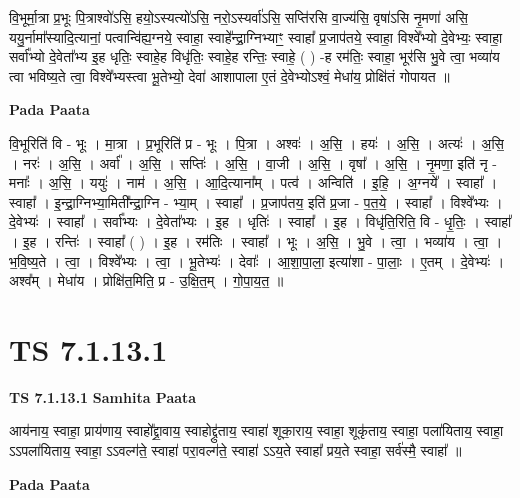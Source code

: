 \documentclass[17pt]{extarticle}
\begin{document}
वि॒भूर्मा॒त्रा प्र॒भूः पि॒त्राश्वो॑ऽसि॒ हयो॒ऽस्यत्यो॑ऽसि॒ नरो॒ऽस्यर्वा॑ऽसि॒ सप्ति॑रसि वा॒ज्य॑सि॒ वृषा॑ऽसि नृ॒मणा॑ असि॒ ययु॒र्नामा᳚स्यादि॒त्यानां॒ पत्वान्वि॑ह्य॒ग्नये॒ स्वाहा॒ स्वाहे᳚न्द्रा॒ग्निभ्याꣳ॒॒ स्वाहा᳚ प्र॒जाप॑तये॒ स्वाहा॒ विश्वे᳚भ्यो दे॒वेभ्यः॒ स्वाहा॒ सर्वा᳚भ्यो दे॒वेता᳚भ्य इ॒ह धृतिः॒ स्वाहे॒ह विधृ॑तिः॒ स्वाहे॒ह रन्तिः॒ स्वाहे॒ ( ) -ह रम॑तिः॒ स्वाहा॒ भूर॑सि भु॒वे त्वा॒ भव्या॑य त्वा भविष्य॒ते त्वा॒ विश्वे᳚भ्यस्त्वा भू॒तेभ्यो॒ देवा॑ आशापाला ए॒तं दे॒वेभ्योऽश्वं॒ मेधा॑य॒ प्रोक्षि॑तं गोपायत ॥ \newline

\textbf{Pada Paata} \newline

वि॒भूरिति॑ वि - भूः । मा॒त्रा । प्र॒भूरिति॑ प्र - भूः । पि॒त्रा । अश्वः॑ । अ॒सि॒ । हयः॑ । अ॒सि॒ । अत्यः॑ । अ॒सि॒ । नरः॑ । अ॒सि॒ । अर्वा᳚ । अ॒सि॒ । सप्तिः॑ । अ॒सि॒ । वा॒जी । अ॒सि॒ । वृषा᳚ । अ॒सि॒ । नृ॒मणा॒ इति॑ नृ - मनाः᳚ । अ॒सि॒ । ययुः॑ । नाम॑ । अ॒सि॒ । आ॒दि॒त्याना᳚म् । पत्व॑ । अन्विति॑ । इ॒हि॒ । अ॒ग्नये᳚ । स्वाहा᳚ । स्वाहा᳚ । इ॒न्द्रा॒ग्निभ्या॒मिती᳚न्द्रा॒ग्नि - भ्या॒म् । स्वाहा᳚ । प्र॒जाप॑तय॒ इति॑ प्र॒जा - प॒त॒ये॒ । स्वाहा᳚ । विश्वे᳚भ्यः । दे॒वेभ्यः॑ । स्वाहा᳚ । सर्वा᳚भ्यः । दे॒वेता᳚भ्यः । इ॒ह । धृतिः॑ । स्वाहा᳚ । इ॒ह । विधृ॑ति॒रिति॒ वि - धृ॒तिः॒ । स्वाहा᳚ । इ॒ह । रन्तिः॑ । स्वाहा᳚ ( ) । इ॒ह । रम॑तिः । स्वाहा᳚ । भूः । अ॒सि॒ । भु॒वे । त्वा॒ । भव्या॑य । त्वा॒ । भ॒वि॒ष्य॒ते । त्वा॒ । विश्वे᳚भ्यः । त्वा॒ । भू॒तेभ्यः॑ । देवाः᳚ । आ॒शा॒पा॒ला॒ इत्या॑शा - पा॒लाः॒ । ए॒तम् । दे॒वेभ्यः॑ । अश्व᳚म् । मेधा॑य । प्रोक्षि॑त॒मिति॒ प्र - उ॒क्षि॒त॒म् । गो॒पा॒य॒त॒ ॥  \newline





\section{ TS 7.1.13.1 }

\textbf{TS 7.1.13.1 } \newline
\textbf{Samhita Paata} \newline

आय॑नाय॒ स्वाहा॒ प्राय॑णाय॒ स्वाहो᳚द्द्रा॒वाय॒ स्वाहोद्द्रु॑ताय॒ स्वाहा॑ शूका॒राय॒ स्वाहा॒ शूकृ॑ताय॒ स्वाहा॒ पला॑यिताय॒ स्वाहा॒ ऽऽपला॑यिताय॒ स्वाहा॒ ऽऽवल्ग॑ते॒ स्वाहा॑ परा॒वल्ग॑ते॒ स्वाहा॑ ऽऽय॒ते स्वाहा᳚ प्रय॒ते स्वाहा॒ सर्व॑स्मै॒ स्वाहा᳚ ॥ \newline

\textbf{Pada Paata} \newline
\end{document}
